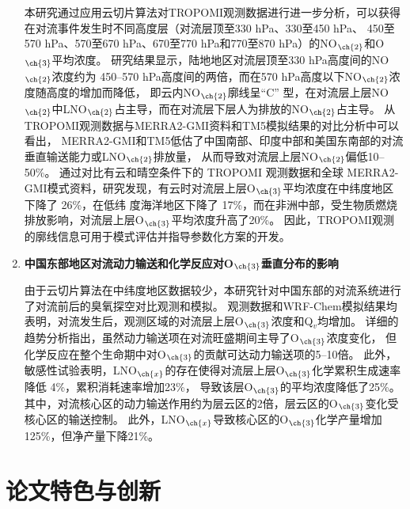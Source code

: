 \begin{enumerate}[label=（\arabic*）, labelindent=\parindent, nosep, leftmargin=0pt, widest=0, itemindent=*, topsep=0pt, partopsep=0pt, parsep=0pt]
\hspace{4ex} 本研究通过应用云切片算法对TROPOMI观测数据进行进一步分析，可以获得在对流事件发生时不同高度层（对流层顶至330 hPa、330至450 hPa、
450至570 hPa、570至670 hPa、670至770 hPa和770至870 hPa）的NO$_{\ch{2}}$和O$_{\ch{3}}$平均浓度。
研究结果显示，陆地地区对流层顶至330 hPa高度间的NO$_{\ch{2}}$浓度约为 450--570 hPa高度间的两倍，而在570 hPa高度以下NO$_{\ch{2}}$浓度随高度的增加而降低，
即云内NO$_{\ch{2}}$廓线呈“C” 型，在对流层上层NO$_{\ch{2}}$中LNO$_{\ch{2}}$占主导，而在对流层下层人为排放的NO$_{\ch{2}}$占主导。
从TROPOMI观测数据与MERRA2-GMI资料和TM5模拟结果的对比分析中可以看出，
MERRA2-GMI和TM5低估了中国南部、印度中部和美国东南部的对流垂直输送能力或LNO$_{\ch{2}}$排放量，
从而导致对流层上层NO$_{\ch{2}}$偏低10--50\%。
通过对比有云和晴空条件下的 TROPOMI 观测数据和全球
MERRA2-GMI模式资料，研究发现，有云时对流层上层O$_{\ch{3}}$平均浓度在中纬度地区下降了 26\%，在低纬
度海洋地区下降了 17\%，而在非洲中部，受生物质燃烧排放影响，对流层上层O$_{\ch{3}}$平均浓度升高了20\%。
因此，TROPOMI观测的廓线信息可用于模式评估并指导参数化方案的开发。

\item \textbf{中国东部地区对流动力输送和化学反应对O$_{\ch{3}}$垂直分布的影响}

\hspace{4ex} 由于云切片算法在中纬度地区数据较少，本研究针对中国东部的对流系统进行了对流前后的臭氧探空对比观测和模拟。
观测数据和WRF-Chem模拟结果均表明，对流发生后，观测区域的对流层上层O$_{\ch{3}}$浓度和Q$_v$均增加。
详细的趋势分析指出，虽然动力输送项在对流旺盛期间主导了O$_{\ch{3}}$浓度变化，
但化学反应在整个生命期中对O$_{\ch{3}}$的贡献可达动力输送项的5--10倍。
此外，敏感性试验表明，LNO$_{\ch{x}}$的存在使得对流层上层O$_{\ch{3}}$化学累积生成速率降低 4\%，累积消耗速率增加23\%，
导致该层O$_{\ch{3}}$的平均浓度降低了25\%。
其中，对流核心区的动力输送作用约为层云区的2倍，层云区的O$_{\ch{3}}$变化受核心区的输送控制。
此外，LNO$_{\ch{x}}$导致核心区的O$_{\ch{3}}$化学产量增加125\%，但净产量下降21\%。


\end{enumerate}

\section{论文特色与创新}


